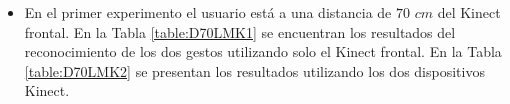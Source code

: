 \begin{itemize}

\item En el primer experimento el usuario est\'a a una distancia de $70$ $cm$ del Kinect frontal. En la Tabla \ref{table:D70LMK1} se encuentran los resultados del reconocimiento de los dos gestos utilizando solo el Kinect frontal. En la Tabla \ref{table:D70LMK2} se presentan los resultados utilizando los dos dispositivos Kinect. 

%


\end{itemize}
